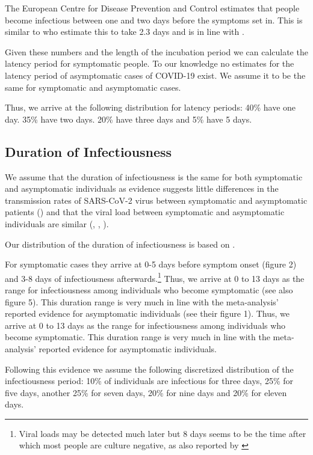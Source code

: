 The European Centre for Disease Prevention and Control estimates that people become infectious between one and two days before the symptoms set in. This is similar to \cite{He2020} who estimate this to take 2.3 days and is in line with \cite{Peak2020}.

Given these numbers and the length of the incubation period we can calculate the latency period for symptomatic people. To our knowledge no estimates for the latency period of asymptomatic cases of COVID-19 exist. We assume it to be the same for symptomatic and asymptomatic cases.

Thus, we arrive at the following distribution for latency periods: 40\% have one day. 35\% have two days. 20\% have three days and 5\% have 5 days.


\subsection{Duration of Infectiousness}

We assume that the duration of infectiousness is the same for both symptomatic and asymptomatic individuals as evidence suggests little differences in the transmission rates of SARS-CoV-2 virus between symptomatic and asymptomatic patients (\cite{Yin2020}) and that the viral load between symptomatic and asymptomatic individuals are similar (\cite{Zou2020}, \cite{Byrne2020}, \cite{Singanayagam2020}).

Our distribution of the duration of infectiousness is based on \cite{Byrne2020}.

For symptomatic cases they arrive at 0-5 days before symptom onset (figure 2) and 3-8 days of infectiousness afterwards.\footnote{Viral loads may be detected much later but 8 days seems to be the time after which most people are culture negative, as also reported by \cite{Singanayagam2020}} Thus, we arrive at 0 to 13 days as the range for infectiousness among individuals who become symptomatic (see also figure 5). This duration range is very much in line with the meta-analysis’ reported evidence for asymptomatic individuals (see their figure 1). Thus, we arrive at 0 to 13 days as the range for infectiousness among individuals who become symptomatic. This duration range is very much in line with the meta-analysis' reported evidence for asymptomatic individuals.

Following this evidence we assume the following discretized distribution of the infectiousness period: 10\% of individuals are infectious for three days, 25\% for five days, another 25\% for seven days, 20\% for nine days and 20\% for eleven days.


